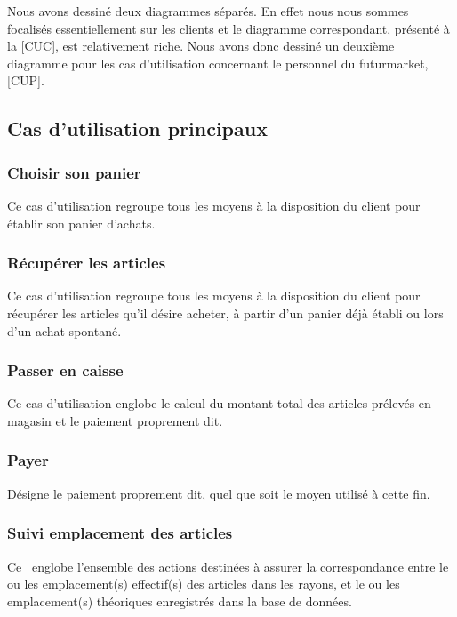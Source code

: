 Nous avons dessiné deux diagrammes séparés.
En effet nous nous sommes focalisés essentiellement sur les clients et le diagramme correspondant, présenté à la [CUC], est relativement riche.
Nous avons donc dessiné un deuxième diagramme pour les cas d'utilisation concernant le personnel du futurmarket, [CUP].

\subsection{Cas d'utilisation principaux}

\subsubsection{Choisir son panier}
Ce cas d'utilisation regroupe tous les moyens à la disposition du client pour établir son panier d'achats.

\subsubsection{Récupérer les articles}
Ce cas d'utilisation regroupe tous les moyens à la disposition du client pour récupérer les articles qu'il désire acheter, à partir d'un panier déjà établi ou lors d'un achat spontané.

\subsubsection{Passer en caisse}
Ce cas d'utilisation englobe le calcul du montant total des articles prélevés en magasin et le paiement proprement dit.

\subsubsection{Payer}
Désigne le paiement proprement dit, quel que soit le moyen utilisé à cette fin.

\subsubsection{Suivi emplacement des articles}
Ce \cu\ englobe l'ensemble des actions destinées à assurer la correspondance entre le ou les emplacement(s) effectif(s) des articles dans les rayons, et le ou les emplacement(s) théoriques enregistrés dans la base de données.

